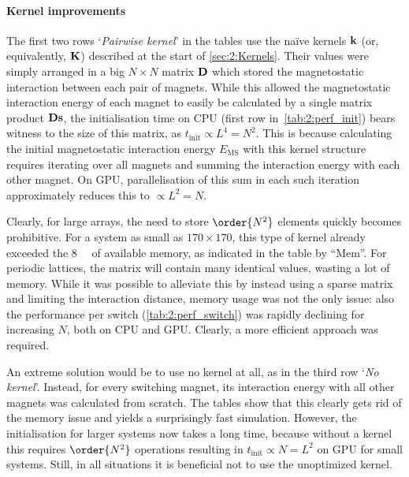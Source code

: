 \paragraph{Kernel improvements}
The first two rows `\textit{Pairwise kernel}' in the tables use the na\"ive kernels $\boldsymbol{\mathbf{k}}$ (or, equivalently, $\boldsymbol{\mathbf{K}}$) described at the start of \cref{sec:2:Kernels}.
Their values were simply arranged in a big $N \times N$ matrix $\boldsymbol{\mathbf{D}}$ which stored the magnetostatic interaction between each pair of magnets.
While this allowed the magnetostatic interaction energy of each magnet to easily be calculated by a single matrix product $\boldsymbol{\mathbf{D}}\boldsymbol{\mathbf{s}}$, the initialisation time on CPU (first row in~\cref{tab:2:perf_init}) bears witness to the size of this matrix, as $t_\mathrm{init} \propto L^4 = N^2$.
This is because calculating the initial magnetostatic interaction energy $E_\mathrm{MS}$ with this kernel structure requires iterating over all magnets and summing the interaction energy with each other magnet.
On GPU, parallelisation of this sum in each such iteration approximately reduces this to $\propto L^2 = N$. \par
Clearly, for large arrays, the need to store $\order{N^2}$ elements quickly becomes prohibitive.
For a system as small as $170 \times 170$, this type of kernel already exceeded the \SI{8}{\giga\byte} of available memory, as indicated in the table by ``Mem''.
For periodic lattices, the matrix will contain many identical values, wasting a lot of memory.
While it was possible to alleviate this by instead using a sparse matrix and limiting the interaction distance, memory usage was not the only issue: also the performance per switch (\cref{tab:2:perf_switch}) was rapidly declining for increasing $N$, both on CPU and GPU. %
Clearly, a more efficient approach was required. \\\par

An extreme solution would be to use no kernel at all, as in the third row `\textit{No kernel}'.
Instead, for every switching magnet, its interaction energy with all other magnets was calculated from scratch.
The tables show that this clearly gets rid of the memory issue and yields a surprisingly fast simulation.
However, the initialisation for larger systems now takes a long time, because without a kernel this requires $\order{N^2}$ operations resulting in $t_\mathrm{init} \propto N=L^2$ on GPU for small systems.
Still, in all situations it is beneficial not to use the unoptimized kernel. \\\par

